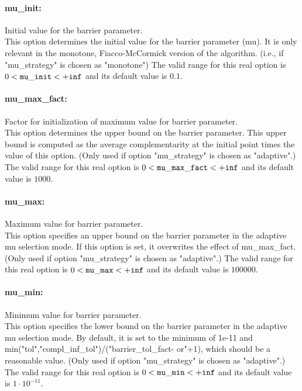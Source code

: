 \paragraph{mu\_init:}\label{sec:mu_init} Initial value for the barrier parameter. $\;$ \\
 This option determines the initial value for the
barrier parameter (mu).  It is only relevant in
the monotone, Fiacco-McCormick version of the
algorithm. (i.e., if "mu\_strategy" is chosen as
"monotone") The valid range for this real option is 
$0 <  {\tt mu\_init } <  {\tt +inf}$
and its default value is $0.1$.


\paragraph{mu\_max\_fact:}\label{sec:mu_max_fact} Factor for initialization of maximum value for barrier parameter. $\;$ \\
 This option determines the upper bound on the
barrier parameter.  This upper bound is computed
as the average complementarity at the initial
point times the value of this option. (Only used
if option "mu\_strategy" is chosen as "adaptive".) The valid range for this real option is 
$0 <  {\tt mu\_max\_fact } <  {\tt +inf}$
and its default value is $1000$.


\paragraph{mu\_max:}\label{sec:mu_max} Maximum value for barrier parameter. $\;$ \\
 This option specifies an upper bound on the
barrier parameter in the adaptive mu selection
mode.  If this option is set, it overwrites the
effect of mu\_max\_fact. (Only used if option
"mu\_strategy" is chosen as "adaptive".) The valid range for this real option is 
$0 <  {\tt mu\_max } <  {\tt +inf}$
and its default value is $100000$.


\paragraph{mu\_min:}\label{sec:mu_min} Minimum value for barrier parameter. $\;$ \\
 This option specifies the lower bound on the
barrier parameter in the adaptive mu selection
mode. By default, it is set to the minimum of
1e-11 and
min("tol","compl\_inf\_tol")/("barrier\_tol\_fact-
or"+1), which should be a reasonable value. (Only
used if option "mu\_strategy" is chosen as
"adaptive".) The valid range for this real option is 
$0 <  {\tt mu\_min } <  {\tt +inf}$
and its default value is $1 \cdot 10^{-11}$.


